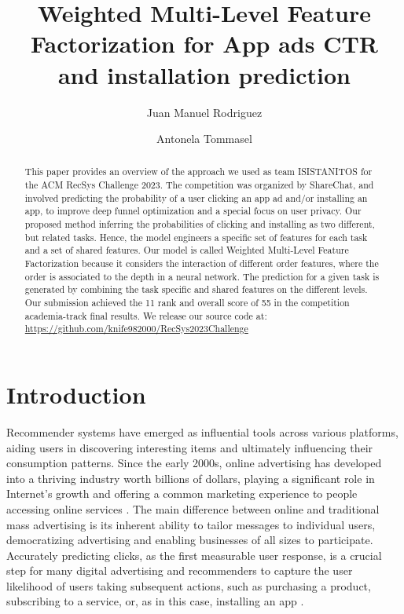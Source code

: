 \documentclass[manuscript,nonacm]{acmart}
\begin{document}
\title{Weighted Multi-Level Feature Factorization for App ads CTR and installation prediction }

\author{Juan Manuel Rodriguez}


\author{Antonela Tommasel}

\begin{abstract}
This paper provides an overview of the approach we used as team ISISTANITOS for the ACM RecSys Challenge 2023. 
The competition was organized by ShareChat, and involved predicting the probability of a user clicking an app ad and/or installing an app, to improve deep funnel optimization and a special focus on user privacy.
Our proposed method inferring the probabilities of clicking and installing as two different, but related tasks. 
Hence, the model engineers a specific set of features for each task and a set of shared features. 
Our model is called Weighted Multi-Level Feature Factorization because it considers the interaction of different order features, where the order is associated to the depth in a neural network. The prediction for a given task is generated by combining the task specific and shared features on the different levels.  
Our submission achieved the 11 rank and overall score of 55 in the competition academia-track final results.
We release our source code at: \url{https://github.com/knife982000/RecSys2023Challenge}

\end{abstract}

\maketitle

\section{Introduction}

Recommender systems have emerged as influential tools across various platforms, aiding users in discovering interesting items and ultimately influencing their consumption patterns. Since the early 2000s, online advertising has developed into a thriving industry worth billions of dollars, playing a significant role in Internet’s growth and offering a common marketing experience to people accessing online services \cite{gharibshah2021user}. The main difference between online and traditional mass advertising is its inherent ability to tailor messages to individual users, democratizing advertising and enabling businesses of all sizes to participate. Accurately predicting clicks, as the first measurable user response, is a crucial step for many digital advertising and recommenders to capture the user likelihood of users taking subsequent actions, such as purchasing a product, subscribing to a service, or, as in this case, installing an app \cite{gharibshah2021user}.
\end{document}
